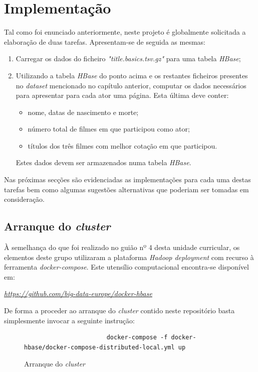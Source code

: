 \documentclass[a4paper]{report}
\begin{document}
\chapter{Implementação} \label{ch:Implementation}
\large {
	Tal como foi enunciado anteriormente, neste projeto é globalmente solicitada a elaboração de duas tarefas. Apresentam-se de seguida as mesmas:
	\begin{enumerate}
		\item Carregar os dados do ficheiro \textit{"title.basics.tsv.gz"} para uma tabela \textit{HBase};
		\item Utilizando a tabela \textit{HBase} do ponto acima e os restantes ficheiros presentes no \textit{dataset} mencionado no capítulo anterior, computar os dados necessários para apresentar para cada ator uma página. Esta última deve conter:
		\begin{itemize}
			\item nome, datas de nascimento e morte;
			\item número total de filmes em que participou como ator;
			\item títulos dos três filmes com melhor cotação em que participou.
		\end{itemize}
		Estes dados devem ser armazenados numa tabela \textit{HBase}.
	\end{enumerate}
	
	Nas próximas secções são evidenciadas as implementações para cada uma destas tarefas bem como algumas sugestões alternativas que poderiam ser tomadas em consideração.
	
	\section{Arranque do \textit{cluster}} \label{sec:Cluster}
		À semelhança do que foi realizado no guião nº 4 desta unidade curricular, os elementos deste grupo utilizaram a plataforma \textit{Hadoop deployment} com recurso à ferramenta \textit{docker-compose}. Este utensílio computacional encontra-se disponível em:
		\begin{center}
			\textit{\url{https://github.com/big-data-europe/docker-hbase}}
		\end{center}

		De forma a proceder ao arranque do \textit{cluster} contido neste repositório basta simplesmente invocar a seguinte instrução:
		\begin{figure}[H]
			{
				\color{teal}
				\begin{verbatim}
				       docker-compose -f docker-hbase/docker-compose-distributed-local.yml up
				\end{verbatim}
			}
			\caption{Arranque do \textit{cluster}}
            \label{fig:1}
		\end{figure}

}
\end{document}
